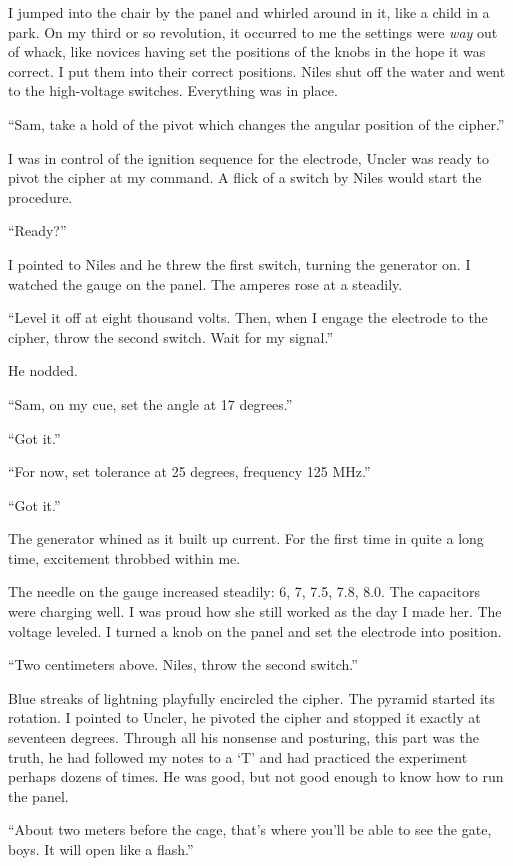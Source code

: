 \documentclass[
]{article}
\begin{document}
I jumped into the chair by the panel and whirled around in it, like a
child in a park. On my third or so revolution, it occurred to me the
settings were \emph{way} out of whack, like novices having set the
positions of the knobs in the hope it was correct. I put them into their
correct positions. Niles shut off the water and went to the high-voltage
switches. Everything was in place.

``Sam, take a hold of the pivot which changes the angular position of
the cipher.''

I was in control of the ignition sequence for the electrode, Uncler was
ready to pivot the cipher at my command. A flick of a switch by Niles
would start the procedure.

``Ready?''

I pointed to Niles and he threw the first switch, turning the generator
on. I watched the gauge on the panel. The amperes rose at a steadily.

``Level it off at eight thousand volts. Then, when I engage the
electrode to the cipher, throw the second switch. Wait for my signal.''

He nodded.

``Sam, on my cue, set the angle at 17 degrees.''

``Got it.''

``For now, set tolerance at 25 degrees, frequency 125 MHz.''

``Got it.''

The generator whined as it built up current. For the first time in quite
a long time, excitement throbbed within me.

The needle on the gauge increased steadily: 6, 7, 7.5, 7.8, 8.0. The
capacitors were charging well. I was proud how she still worked as the
day I made her. The voltage leveled. I turned a knob on the panel and
set the electrode into position.

``Two centimeters above. Niles, throw the second switch.''

Blue streaks of lightning playfully encircled the cipher. The pyramid
started its rotation. I pointed to Uncler, he pivoted the cipher and
stopped it exactly at seventeen degrees. Through all his nonsense and
posturing, this part was the truth, he had followed my notes to a `T'
and had practiced the experiment perhaps dozens of times. He was good,
but not good enough to know how to run the panel.

``About two meters before the cage, that's where you'll be able to see
the gate, boys. It will open like a flash.''
\end{document}

